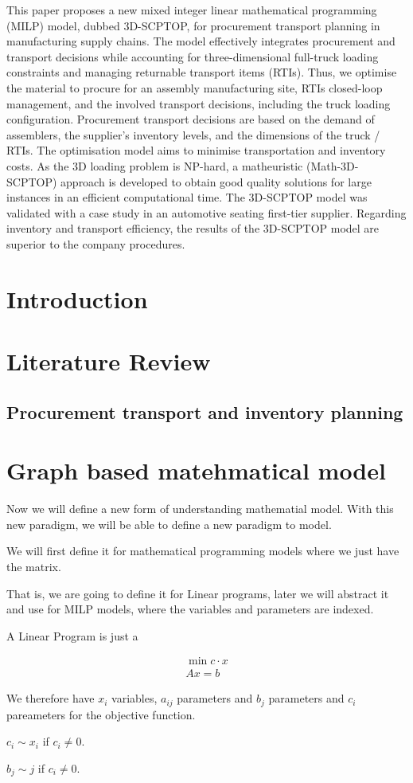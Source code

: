 

This paper proposes a new mixed integer linear mathematical programming (MILP) model, dubbed 3D-SCPTOP, for procurement transport planning in manufacturing supply chains. The model effectively integrates procurement and transport decisions while accounting for three-dimensional full-truck loading constraints and managing returnable transport items (RTIs). Thus, we optimise the material to procure for an assembly manufacturing site, RTIs closed-loop management,  and the involved transport decisions, including the truck loading configuration. Procurement transport decisions are based on the demand of assemblers, the supplier's inventory levels, and the dimensions of the truck / RTIs. The optimisation model aims to minimise transportation and inventory costs. As the 3D loading problem is NP-hard, a matheuristic (Math-3D-SCPTOP) approach is developed to obtain good quality solutions for large instances in an efficient computational time. The 3D-SCPTOP model was validated with a case study in an automotive seating first-tier supplier. Regarding inventory and transport efficiency, the results of the 3D-SCPTOP model are superior to the company procedures.

\section{Introduction}

\section{Literature Review}
\subsection{Procurement transport and inventory planning}
\section{Graph based matehmatical model}
Now we will define a new form of understanding mathematial model. With this new paradigm, we will be able to define a new paradigm to model.

We will first define it for mathematical programming models where we just have the matrix. 

That is, we are going to define it for Linear programs, later we will abstract it and use for MILP models, where the variables and parameters are indexed.

A Linear Program is just a 

\begin{align}
  \min c \cdot x \\
  Ax = b
\end{align}

We therefore have $x_i$ variables, $a_{ij}$ parameters and $b_j$ parameters and $c_i$ pareameters for the objective function.

$c_i \sim{ x_i}$ if $c_i\neq 0$.

$b_j \sim { j }$ if $c_i\neq 0$.
